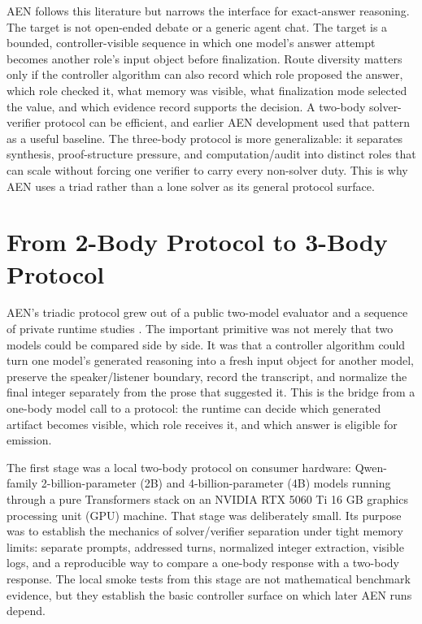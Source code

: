 \documentclass[11pt]{article}
\begin{document}
AEN follows this literature but narrows the interface for exact-answer reasoning. The target is not open-ended debate or a generic agent chat. The target is a bounded, controller-visible sequence in which one model's answer attempt becomes another role's input object before finalization. Route diversity matters only if the controller algorithm can also record which role proposed the answer, which role checked it, what memory was visible, what finalization mode selected the value, and which evidence record supports the decision. A two-body solver-verifier protocol can be efficient, and earlier AEN development used that pattern as a useful baseline. The three-body protocol is more generalizable: it separates synthesis, proof-structure pressure, and computation/audit into distinct roles that can scale without forcing one verifier to carry every non-solver duty. This is why AEN uses a triad rather than a lone solver as its general protocol surface.

\section{From 2-Body Protocol to 3-Body Protocol}

AEN's triadic protocol grew out of a public two-model evaluator and a sequence of private runtime studies \citep{paudel2026twollm}. The important primitive was not merely that two models could be compared side by side. It was that a controller algorithm could turn one model's generated reasoning into a fresh input object for another model, preserve the speaker/listener boundary, record the transcript, and normalize the final integer separately from the prose that suggested it. This is the bridge from a one-body model call to a protocol: the runtime can decide which generated artifact becomes visible, which role receives it, and which answer is eligible for emission.

The first stage was a local two-body protocol on consumer hardware: Qwen-family 2-billion-parameter (2B) and 4-billion-parameter (4B) models running through a pure Transformers stack on an NVIDIA RTX 5060 Ti 16 GB graphics processing unit (GPU) machine. That stage was deliberately small. Its purpose was to establish the mechanics of solver/verifier separation under tight memory limits: separate prompts, addressed turns, normalized integer extraction, visible logs, and a reproducible way to compare a one-body response with a two-body response. The local smoke tests from this stage are not mathematical benchmark evidence, but they establish the basic controller surface on which later AEN runs depend.
\end{document}

